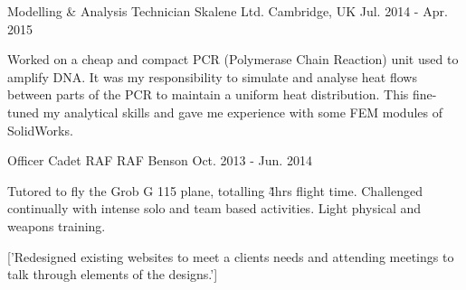 \begin{cventries}
    \cventry
        {Modelling \& Analysis Technician}
        {Skalene Ltd.}
        {Cambridge, UK}
        {Jul. 2014 - Apr. 2015}
        {
            \begin{cvitems}
                \item{Worked on a cheap and compact PCR (Polymerase Chain Reaction) unit used to amplify DNA. It was my responsibility to simulate and analyse heat flows between parts of the PCR to maintain a uniform heat distribution. This fine-tuned my analytical skills and gave me experience with some FEM modules of SolidWorks.}
            \end{cvitems}
        }


    \cventry
        {Officer Cadet}
        {RAF}
        {RAF Benson}
        {Oct. 2013 - Jun. 2014}
        {
            \begin{cvitems}
                \item{Tutored to fly the Grob G 115 plane, totalling \~4hrs flight time. Challenged continually with intense solo and team based activities. Light physical and weapons training.}
            \end{cvitems}
        }


    \cventry
        {}
        {['Redesigned existing websites to meet a clients needs and attending meetings to talk through elements of the designs.\n']}
        {}
        {}
        {
            \begin{cvitems}
                
            \end{cvitems}
        }

\end{cventries}